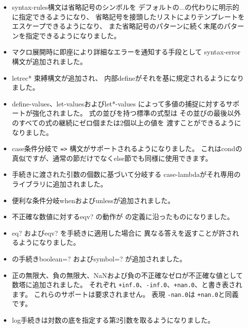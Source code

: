 \begin{itemize}
\item {\cf syntax-rules}構文は省略記号のシンボルを
デフォルトの{\cf ...}の代わりに明示的に指定できるようになり、
省略記号を接頭したリストによりテンプレートをエスケープできるようになり、
また省略記号のパターンに続く末尾のパターンを指定できるようになりました。

\item マクロ展開時に即座により詳細なエラーを通知する手段として
{\cf syntax-error}構文が追加されました。

\item {\cf letrec*} 束縛構文が追加され、
内部{\cf define}がそれを基に規定されるようになりました。

\item {\cf define-values}、{\cf let-values}および{\cf let*-values}
によって多値の捕捉に対するサポートが強化されました。
式の並びを持つ標準の式型は
その並びの最後以外のすべての式の継続にゼロ個または2個以上の値を
渡すことができるようになりました。

\item {\cf case}条件分岐で {\tt =>} 構文がサポートされるようになりました。
これは{\cf cond}の真似ですが、通常の節だけでなく{\cf else}節でも同様に使用できます。

\item 手続きに渡された引数の個数に基づいて分岐する
{\cf case-lambda}がそれ専用のライブラリに追加されました。

\item 便利な条件分岐{\cf when}および{\cf unless}が追加されました。

\item 不正確な数値に対する{\cf eqv?} の動作が
\rsixrs{}の定義に沿ったものになりました。

\item {\cf eq?} および{\cf eqv?} を手続きに適用した場合に
異なる答えを返すことが許されるようになりました。

\item \rsixrs{}の手続き{\cf boolean=?} および{\cf symbol=?} が追加されました。

\item 正の無限大、負の無限大、NaNおよび負の不正確なゼロが不正確な値として数塔に追加されました。
それぞれ {\tt +inf.0}、{\tt -inf.0}、{\tt +nan.0}、{}と書き表されます。
これらのサポートは要求されません。
表現 {\tt -nan.0}は {\tt +nan.0}と同義です。

\item {\cf log}手続きは対数の底を指定する第2引数を取るようになりました。


\end{itemize}

